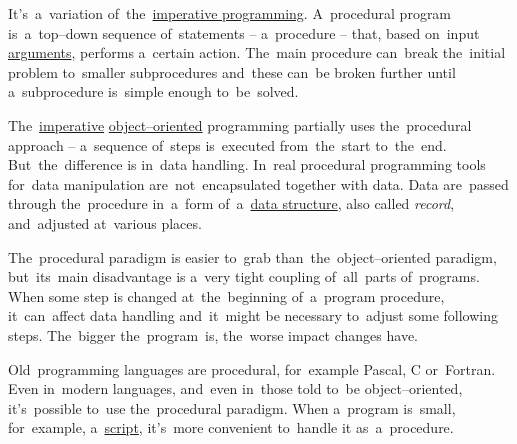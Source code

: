 It's~a~variation of~the~\hyperref[imperativeprogramming]{imperative programming}.
A~procedural program is~a~top--down sequence of~statements -- a~procedure -- that, based on~input \hyperref[parameterargument]{arguments}, performs a~certain action.
The~main procedure can~break the~initial problem to~smaller subprocedures and~these can~be broken further until a~subprocedure is~simple enough to~be~solved.

The~\hyperref[imperativeprogramming]{imperative} \hyperref[objectorientedprogramming]{object--oriented} programming partially uses the~procedural approach -- a~sequence of~steps is~executed from~the~start to~the~end.
But~the~difference is in~data handling.
In~real procedural programming tools for~data manipulation are~not~encapsulated together with data.
Data are~passed through the~procedure in~a~form of~a~\hyperref[datastructure]{data structure}, also called \textit{record}, and~adjusted at~various places.

The~procedural paradigm is easier to~grab than~the~object--oriented paradigm, but~its~main disadvantage is a~very tight coupling of~all~parts of~programs.
When some step is changed at~the~beginning of~a~program procedure, it~can~affect data handling and~it~might be necessary to~adjust some following steps.
The~bigger the~program~is, the~worse impact changes have.

Old~programming languages are procedural, for~example Pascal, C or~Fortran.
Even in~modern languages, and~even in~those told to~be object--oriented, it's~possible to~use the~procedural paradigm.
When a~program is~small, for~example, a~\hyperref[scriptinglanguages]{script}, it's~more convenient to~handle it as~a~procedure.
